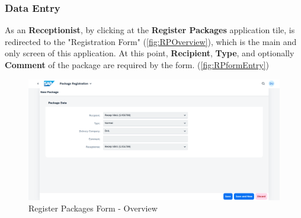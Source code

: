 \subsubsection{Data Entry}

As an \textbf{Receptionist}, by clicking at the \textbf{Register Packages} application tile, is redirected to the "Registration Form" (\autoref{fig:RPOverview}), which is the main and only screen of this application. At this point, \textbf{Recipient}, \textbf{Type}, \textbf{} and optionally \textbf{Comment} of the package are required by the form. (\autoref{fig:RPformEntry})

\begin{figure}[H]
	\centering
	\includegraphics[width=1\linewidth]{images/user_doc/registration/overview.png}
	\caption{Register Packages Form - Overview}
	\label{fig:RPOverview}
\end{figure}


